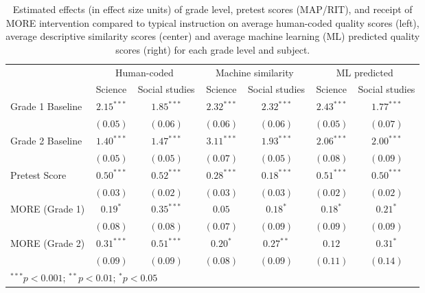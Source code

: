 
\begin{table}
\caption{Estimated effects (in effect size units) of grade level, pretest scores (MAP/RIT),
               and receipt of MORE intervention compared to typical instruction on  average human-coded quality scores (left),
               average descriptive similarity scores (center) and average machine learning (ML) predicted quality scores (right)
               for each grade level and subject.}
\begin{center}
\begin{tabular}{l c c c c c c}
\hline
 & \multicolumn{2}{c}{Human-coded} & \multicolumn{2}{c}{Machine similarity} & \multicolumn{2}{c}{ML predicted} \\
\cline{2-3} \cline{4-5} \cline{6-7}
 & Science & Social studies & Science & Social studies & Science & Social studies \\
\hline
Grade 1 Baseline & $2.15^{***}$ & $1.85^{***}$ & $2.32^{***}$ & $2.32^{***}$ & $2.43^{***}$ & $1.77^{***}$ \\
                 & $(0.05)$     & $(0.06)$     & $(0.06)$     & $(0.06)$     & $(0.05)$     & $(0.07)$     \\
Grade 2 Baseline & $1.40^{***}$ & $1.47^{***}$ & $3.11^{***}$ & $1.93^{***}$ & $2.06^{***}$ & $2.00^{***}$ \\
                 & $(0.05)$     & $(0.05)$     & $(0.07)$     & $(0.05)$     & $(0.08)$     & $(0.09)$     \\
Pretest Score    & $0.50^{***}$ & $0.52^{***}$ & $0.28^{***}$ & $0.18^{***}$ & $0.51^{***}$ & $0.50^{***}$ \\
                 & $(0.03)$     & $(0.02)$     & $(0.03)$     & $(0.03)$     & $(0.02)$     & $(0.02)$     \\
MORE (Grade 1)   & $0.19^{*}$   & $0.35^{***}$ & $0.05$       & $0.18^{*}$   & $0.18^{*}$   & $0.21^{*}$   \\
                 & $(0.08)$     & $(0.08)$     & $(0.07)$     & $(0.09)$     & $(0.09)$     & $(0.09)$     \\
MORE (Grade 2)   & $0.31^{***}$ & $0.51^{***}$ & $0.20^{*}$   & $0.27^{**}$  & $0.12$       & $0.31^{*}$   \\
                 & $(0.09)$     & $(0.09)$     & $(0.08)$     & $(0.09)$     & $(0.11)$     & $(0.14)$     \\
\hline
\multicolumn{7}{l}{\scriptsize{$^{***}p<0.001$; $^{**}p<0.01$; $^{*}p<0.05$}}
\end{tabular}
\label{tab:MLquality}
\end{center}
\end{table}
